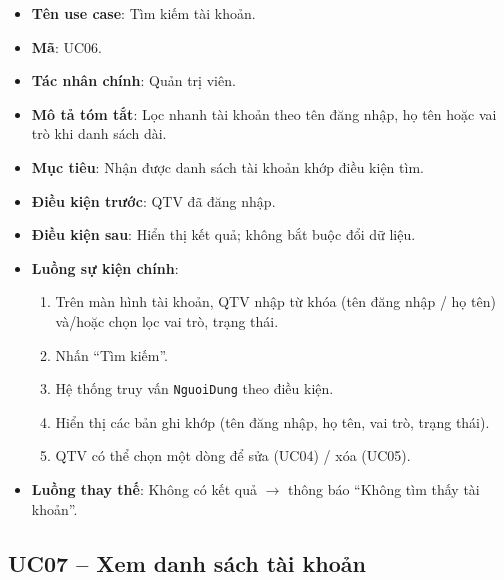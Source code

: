 \begin{itemize}[leftmargin=1.5cm]
    \item \textbf{Tên use case}: Tìm kiếm tài khoản.
    \item \textbf{Mã}: UC06.
    \item \textbf{Tác nhân chính}: Quản trị viên.
    \item \textbf{Mô tả tóm tắt}: Lọc nhanh tài khoản theo tên đăng nhập, họ tên hoặc vai trò khi danh sách dài.
    \item \textbf{Mục tiêu}: Nhận được danh sách tài khoản khớp điều kiện tìm.
    \item \textbf{Điều kiện trước}: QTV đã đăng nhập.
    \item \textbf{Điều kiện sau}: Hiển thị kết quả; không bắt buộc đổi dữ liệu.
    \item \textbf{Luồng sự kiện chính}:
    \begin{enumerate}
        \item Trên màn hình tài khoản, QTV nhập từ khóa (tên đăng nhập / họ tên) và/hoặc chọn lọc vai trò, trạng thái.
        \item Nhấn ``Tìm kiếm''.
        \item Hệ thống truy vấn \texttt{NguoiDung} theo điều kiện.
        \item Hiển thị các bản ghi khớp (tên đăng nhập, họ tên, vai trò, trạng thái).
        \item QTV có thể chọn một dòng để sửa (UC04) / xóa (UC05).
    \end{enumerate}
    \item \textbf{Luồng thay thế}: Không có kết quả $\rightarrow$ thông báo ``Không tìm thấy tài khoản''.
\end{itemize}

\subsection{UC07 -- Xem danh sách tài khoản}

